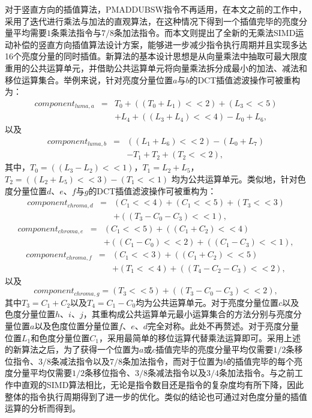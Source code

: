 对于竖直方向的插值算法，PMADDUBSW指令不再适用，在本文之前的工作中，采用了迭代进行乘法与加法的直观算法，在这种情况下得到一个插值完毕的亮度分量平均需要$1$条乘法指令与$7/8$条加法指令。而本文则提出了全新的无乘法SIMD运动补偿的竖直方向插值算法设计方案，能够进一步减少指令执行周期并且实现多达16个亮度分量的同时插值。新算法的基本设计思想是从向量乘法中抽取可最大限度重用的公共运算单元，并借助公共运算单元将向量乘法拆分成最小的加法、减法和移位运算集合。举例来说，针对亮度分量位置$a$与$b$的DCT插值滤波操作可被重构为：
\begin{eqnarray}
component_{luma,a} &=& T_0 + ((T_0+L_1)<<2) + (L_3<<5)
\nonumber 
\\&& + L_4 + ((L_3+L_4)<<4)- L_0 + L_6,
\end{eqnarray}
以及
\begin{eqnarray}
component_{luma,b} &=& ((L_1+L_6)<<2) - (L_0+L_7)
\nonumber 
\\&& - T_1 + T_2 + (T_2<<2),
\end{eqnarray}
其中，$T_0 = ((L_3 - L_2)<<1)$，$T_1 = L_2 + L_5$，$T_2 = ((L_2 + L_5)<<3) - (T_1<<1)$ 均为公共运算单元。类似地，针对色度分量位置$d$、$e$、$f$与$g$的DCT插值滤波操作可被重构为：
\begin{eqnarray}
component_{chroma,d} &=& (C_1<<4) + (C_1<<5) + (T_3<<3)
\nonumber 
\\&& + ((T_3 - C_0 - C_3)<<1),
\end{eqnarray}
\begin{eqnarray}
component_{chroma,e} &=& (C_1<<5) + ((C_1+C_2)<<4) 
\nonumber 
\\&& + ((C_1-C_0)<<2) + ((C_1-C_3)<<1),
\end{eqnarray}
\begin{eqnarray}
component_{chroma,f} &=& (C_1<<3) + ((C_1+C_2)<<5) 
\nonumber 
\\&& + (T_1<<4) + ((T_4-C_2-C_3)<<2),
\end{eqnarray}
以及
\begin{equation}
component_{chroma,g} = (T_3<<5) + ((T_3-C_0-C_3)<<2), 
\end{equation}
其中$T_3 = C_1 + C_2$以及$T_4 = C_1 - C_0$均为公共运算单元。对于亮度分量位置$c$以及色度分量位置$h$、$i$、$j$，其重构成公共运算单元最小运算集合的方法分别与亮度分量位置$a$以及色度位置分量位置$f$、$e$、$d$完全对称。此处不再赘述。对于亮度分量位置$L_1$和色度分量位置$C_1$，采用最简单的移位运算代替乘法运算即可。采用上述的新算法之后，为了获得一个位置为$a$或$c$插值完毕的亮度分量平均仅需要$1/2$条移位指令、$3/8$条减法指令以及$7/8$条加法指令，而对于位置为$b$的插值完毕的每个亮度分量平均仅需要$1/2$条移位指令、$3/8$条减法指令以及$3/4$条加法指令。与之前工作中直观的SIMD算法相比，无论是指令数目还是指令的复杂度均有所下降，因此整体的指令执行周期得到了进一步的优化。类似的结论也可通过对色度分量的插值运算的分析而得到。

